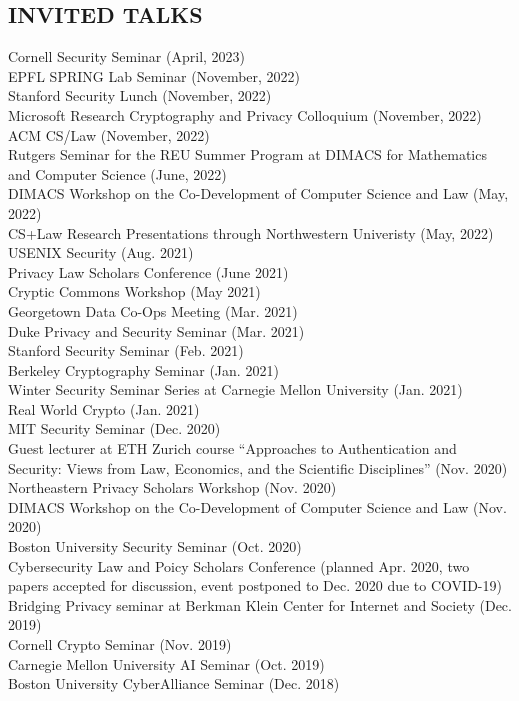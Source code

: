 \documentclass{res}
\begin{document}
\begin{resume}
\section{INVITED TALKS}
\vspace{0.1in}
Cornell Security Seminar (April, 2023) \\
EPFL SPRING Lab Seminar (November, 2022) \\
Stanford Security Lunch (November, 2022) \\
Microsoft Research Cryptography and Privacy Colloquium (November, 2022) \\
ACM CS/Law (November, 2022) \\
Rutgers Seminar for the REU Summer Program at DIMACS for Mathematics and Computer Science (June, 2022) \\
DIMACS Workshop on the Co-Development of Computer Science and Law (May, 2022) \\
CS+Law Research Presentations through Northwestern Univeristy (May, 2022) \\
USENIX Security (Aug. 2021) \\
Privacy Law Scholars Conference (June 2021) \\
Cryptic Commons Workshop (May 2021) \\
Georgetown Data Co-Ops Meeting (Mar. 2021) \\
Duke Privacy and Security Seminar (Mar. 2021) \\
Stanford Security Seminar (Feb. 2021) \\
Berkeley Cryptography Seminar (Jan. 2021) \\
Winter Security Seminar Series at Carnegie Mellon University (Jan. 2021) \\
Real World Crypto (Jan. 2021) \\
MIT Security Seminar (Dec. 2020) \\
Guest lecturer at ETH Zurich course ``Approaches to Authentication and Security: Views from Law,
Economics, and the Scientific Disciplines'' (Nov. 2020) \\
Northeastern Privacy Scholars Workshop (Nov. 2020) \\
DIMACS Workshop on the Co-Development of Computer Science and Law (Nov. 2020) \\
Boston University Security Seminar (Oct. 2020) \\
Cybersecurity Law and Poicy Scholars Conference (planned Apr. 2020, two papers accepted for
discussion, event postponed to Dec. 2020 due to COVID-19) \\
Bridging Privacy seminar at Berkman Klein Center for Internet and Society (Dec. 2019) \\ 
Cornell Crypto Seminar (Nov. 2019) \\
Carnegie Mellon University AI Seminar (Oct. 2019) \\
Boston University CyberAlliance Seminar (Dec. 2018) \\


\end{resume}
\end{document}
